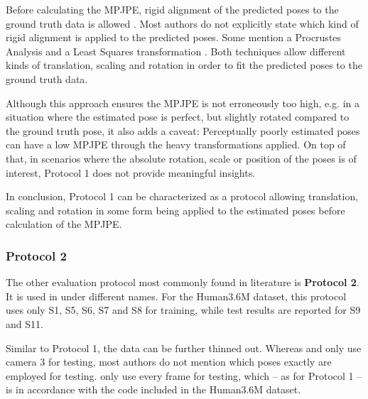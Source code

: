 Before calculating the MPJPE, rigid alignment of the predicted poses to the ground truth data is allowed  \cite{drover18, yasin16, kostrikov14, sun17, tome17, chen17}.
Most authors do not explicitly state which kind of rigid alignment is applied to the predicted poses.
Some mention a Procrustes Analysis \cite{sun17, tome17} and a Least Squares transformation \cite{kostrikov14}.
Both techniques allow different kinds of translation, scaling and rotation in order to fit the predicted poses to the ground truth data.

Although this approach ensures the MPJPE is not erroneously too high, e.g. in a situation where the estimated pose is perfect, but slightly rotated compared to the ground truth pose, it also adds a caveat:
Perceptually poorly estimated poses can have a low MPJPE through the heavy transformations applied.
On top of that, in scenarios where the absolute rotation, scale or position of the poses is of interest, Protocol 1 does not provide meaningful insights.

In conclusion, Protocol 1 can be characterized as a protocol allowing translation, scaling and rotation in some form being applied to the estimated poses before calculation of the MPJPE.

\subsubsection{Protocol 2}\label{sec:protocol2}

The other evaluation protocol most commonly found in literature is \textbf{Protocol 2}.
It is used in \cite{sun17, moreno-noguer16, bogo16, martinez17, zhou18, zhou16, tekin16, pavlakos17} under different names.
For the Human3.6M dataset, this protocol uses only S1, S5, S6, S7 and S8 for training, while test results are reported for S9 and S11.

Similar to Protocol 1, the data can be further thinned out.
Whereas \citet{moreno-noguer16} and \citet{bogo16} only use camera 3 for testing, most authors do not mention which poses exactly are employed for testing.
\citet{sun17} only use every  frame for testing, which -- as for Protocol 1 -- is in accordance with the code included in the Human3.6M dataset.

